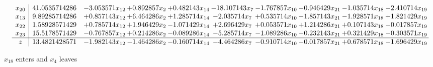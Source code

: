 \documentclass[10pt]{article}
\begin{document}
\[\begin{array}{c| c c@{\hskip 2pt} c@{\hskip 2pt} c@{\hskip 2pt} c@{\hskip 2pt} c@{\hskip 2pt} c@{\hskip 2pt} c@{\hskip 2pt} c@{\hskip 2pt} }
 x_{20}   &  41.0535714286 & -3.053571 x_{12} & + 0.892857 x_{2} & + 0.482143 x_{14} & -18.107143 x_{7} & -1.767857 x_{10} & -0.946429 x_{21} & -1.035714 x_{18} & -2.410714 x_{19}\\
 x_{13}   &  9.89285714286 & + 0.857143 x_{12} & + 6.464286 x_{2} & + 1.285714 x_{14} & -2.035714 x_{7} & + 0.535714 x_{10} & -1.857143 x_{21} & -1.928571 x_{18} & + 1.821429 x_{19}\\
 x_{22}   &  1.58928571429 & + 0.785714 x_{12} & + 1.946429 x_{2} & -1.071429 x_{14} & + 2.696429 x_{7} & + 0.053571 x_{10} & + 1.214286 x_{21} & + 0.107143 x_{18} & -0.017857 x_{19}\\
 x_{23}   &  15.5178571429 & -0.767857 x_{12} & + 0.214286 x_{2} & -0.089286 x_{14} & -5.285714 x_{7} & -1.089286 x_{10} & -0.232143 x_{21} & + 0.321429 x_{18} & -0.303571 x_{19}\\
\hline
z    &  13.4821428571 & -1.982143 x_{12} & -1.464286 x_{2} & -0.160714 x_{14} & -4.464286 x_{7} & -0.910714 x_{10} & -0.017857 x_{21} & + 0.678571 x_{18} & -1.696429 x_{19}\\
\end{array}\]


 $ x_{18} $ enters and $ x_{4} $ leaves 
\end{document}
